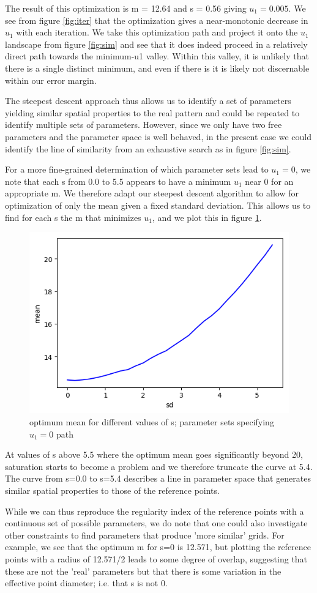 \documentclass{article}
\begin{document}
The result of this optimization is m = 12.64 and s = 0.56 giving $u_1 = 0.005$. We see from figure \ref{fig:iter} that the optimization gives a near-monotonic decrease in $u_1$ with each iteration. We take this optimization path and project it onto the $u_1$ landscape from figure \ref{fig:sim} and see that it does indeed proceed in a relatively direct path towards the minimum-u1 valley. Within this valley, it is unlikely that there is a single distinct minimum, and even if there is it is likely not discernable within our error margin.

The steepest descent approach thus allows us to identify a set of parameters yielding similar spatial properties to the real pattern and could be repeated to identify multiple sets of parameters. 
However, since we only have two free parameters and the parameter space is well behaved, in the present case we could identify the line of similarity from an exhaustive search as in figure \ref{fig:sim}.

For a more fine-grained determination of which parameter sets lead to $u_1=0$, we note that each s from 0.0 to 5.5 appears to have a minimum $u_1$ near 0 for an appropriate m. We therefore adapt our steepest descent algorithm to allow for optimization of only the mean given a fixed standard deviation. This allows us to find for each s the m that minimizes $u_1$, and we plot this in figure \ref{fig:msd}.

\begin{figure}[h]
\centering
\includegraphics[width = 0.4\linewidth, trim={0 0 0 0}, clip=true]{mean_sd_opt.png}
\caption{optimum mean for different values of s; parameter sets specifying $u_1 = 0$ path}
\label{fig:msd}
\end{figure}

At values of s above 5.5 where the optimum mean goes significantly beyond 20, saturation starts to become a problem and we therefore truncate the curve at 5.4. The curve from s=0.0 to s=5.4 describes a line in parameter space that generates similar spatial properties to those of the reference points.


While we can thus reproduce the regularity index of the reference points with a continuous set of possible parameters, we do note that one could also investigate other constraints to find parameters that produce 'more similar' grids. For example, we see that the optimum m for s=0 is 12.571, but plotting the reference points with a radius of 12.571/2 leads to some degree of overlap, suggesting that these are not the 'real' parameters but that there is some variation in the effective point diameter; i.e. that s is not 0.
\end{document}
